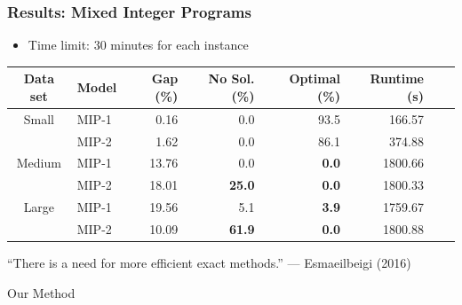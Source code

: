 \documentclass{beamer}
\begin{document}
\begin{frame}
\frametitle{Results: Mixed Integer Programs}
\begin{itemize}
	\item Time limit: 30 minutes for each instance\pause
\end{itemize}
\begin{table}
	\centering
	\begin{tabular}{clrrrrrr}
		\toprule
		Data set & Model & Gap (\%) & No Sol. (\%) & Optimal (\%) & Runtime (s) \\\midrule\midrule
		Small & MIP-1 & 0.16 & 0.0 & 93.5 & 166.57 \\
		 & MIP-2 & 1.62 & 0.0 & 86.1 & 374.88 \\\midrule
		Medium & MIP-1 & 13.76 & 0.0 & {\bf 0.0} & 1800.66 \\
		 & MIP-2  & 18.01 & {\bf 25.0} & {\bf 0.0} & 1800.33 \\\midrule
		Large & MIP-1 & 19.56 & 5.1 & {\bf 3.9} & 1759.67 \\
		 & MIP-2 & 10.09 & {\bf 61.9} & {\bf 0.0} & 1800.88 \\
		\bottomrule
	\end{tabular}\pause
\end{table}

``There is a need for more efficient exact methods.'' --- Esmaeilbeigi (2016)
\end{frame}


\begin{frame}
\Huge{\centerline{Our Method}}
\end{frame}
\end{document}
